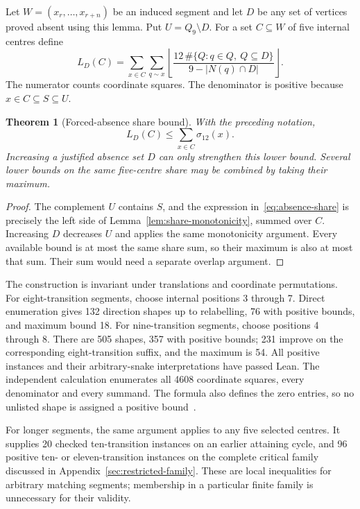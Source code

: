 \documentclass[11pt,a4paper]{article}
\newtheorem{theorem}{Theorem}[section]
\theoremstyle{definition}
\theoremstyle{remark}
\newcommand{\Q}{Q}
\begin{document}
Let $W=(x_r,\ldots,x_{r+n})$ be an induced segment and let $D$ be any set of vertices proved absent using this lemma. Put $U=\Q_9\setminus D$. For a set $C\subseteq W$ of five internal centres define
\begin{equation}\label{eq:absence-share}
L_D(C)=\sum_{x\in C}\sum_{q\sim x}
\left\lfloor\frac{12\,\#\{Q:q\in Q,\ Q\subseteq D\}}
{9-|N(q)\cap D|}\right\rfloor.
\end{equation}
The numerator counts coordinate squares. The denominator is positive because $x\in C\subseteq S\subseteq U$.

\begin{theorem}[Forced-absence share bound]\label{thm:forced-share}
With the preceding notation,
\[
L_D(C)\le\sum_{x\in C}\sigma_{12}(x).
\]
Increasing a justified absence set $D$ can only strengthen this lower bound. Several lower bounds on the same five-centre share may be combined by taking their maximum.
\end{theorem}
\begin{proof}
The complement $U$ contains $S$, and the expression in~\eqref{eq:absence-share} is precisely the left side of Lemma~\ref{lem:share-monotonicity}, summed over $C$. Increasing $D$ decreases $U$ and applies the same monotonicity argument. Every available bound is at most the same share sum, so their maximum is also at most that sum. Their sum would need a separate overlap argument.
\end{proof}

The construction is invariant under translations and coordinate permutations. For eight-transition segments, choose internal positions 3 through 7. Direct enumeration gives 132 direction shapes up to relabelling, 76 with positive bounds, and maximum bound 18. For nine-transition segments, choose positions 4 through 8. There are 505 shapes, 357 with positive bounds; 231 improve on the corresponding eight-transition suffix, and the maximum is 54. All positive instances and their arbitrary-snake interpretations have passed Lean. The independent calculation enumerates all 4608 coordinate squares, every denominator and every summand. The formula also defines the zero entries, so no unlisted shape is assigned a positive bound~\cite{geometricarchive}.

For longer segments, the same argument applies to any five selected centres. It supplies 20 checked ten-transition instances on an earlier attaining cycle, and 96 positive ten- or eleven-transition instances on the complete critical family discussed in Appendix~\ref{sec:restricted-family}. These are local inequalities for arbitrary matching segments; membership in a particular finite family is unnecessary for their validity.
\end{document}
